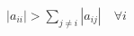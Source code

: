 \documentclass[preview]{standalone}
\begin{document}
\begin{align*}
|a_{ii}| > \sum_{j \neq i} |a_{ij}| \quad \forall i
\end{align*}
\end{document}
